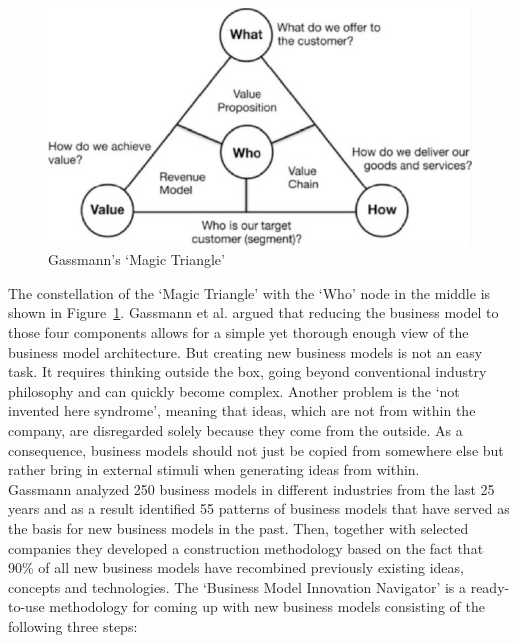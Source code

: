 		\begin{figure}[ht]
		    \begin{center}
		    \includegraphics[scale=1.25]{Talk11/gassmann_triangle.pdf}
		    \end{center}
		    \caption{Gassmann's `Magic Triangle' \cite{gassmann55}}
		    \label{fig:m_triangle}
		\end{figure}
		The constellation of the `Magic Triangle' with the `Who' node in the middle is shown in Figure~\ref{fig:m_triangle}. Gassmann et al. argued that reducing the business model to those four components allows for a simple yet thorough enough view of the business model architecture. But creating new business models is not an easy task. It requires thinking outside the box, going beyond conventional industry philosophy and can quickly become complex. Another problem is the `not invented here syndrome', meaning that ideas, which are not from within the company, are disregarded solely because they come from the outside. As a consequence, business models should not just be copied from somewhere else but rather bring in external stimuli when generating ideas from within.\\
		Gassmann analyzed 250 business models in different industries from the last 25 years and as a result identified 55 patterns of business models that have served as the basis for new business models in the past. Then, together with selected companies they developed a construction methodology based on the fact that 90\% of all new business models have recombined previously existing ideas, concepts and  technologies. The `Business Model Innovation Navigator' is a ready-to-use methodology for coming up with new business models consisting of the following three steps:
		\vspace{-1em}
